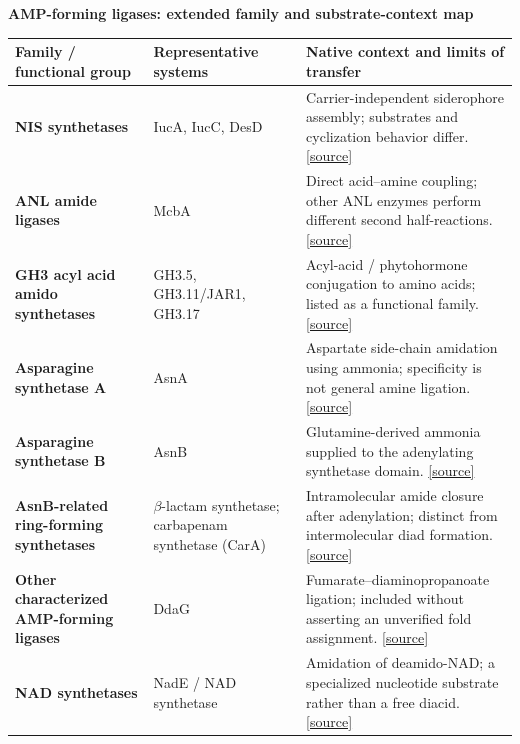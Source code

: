 \documentclass{article}
\begin{document}
{\fontsize{27}{32}\selectfont\bfseries\color{maroon} AMP-forming ligases: extended family and substrate-context map\par}
\par\vspace{16pt}
\fontsize{16}{20}\selectfont
\begin{tabularx}{\textwidth}{@{}>{\raggedright\arraybackslash}p{3.9in}>{\raggedright\arraybackslash}p{3.25in}Y@{}}
\toprule{}\textbf{Family / functional group} & \textbf{Representative systems} & \textbf{Native context and limits of transfer}\\\midrule
\textbf{NIS synthetases} & IucA, IucC, DesD & Carrier-independent siderophore assembly; substrates and cyclization behavior differ. \href{https://pmc.ncbi.nlm.nih.gov/articles/PMC7325057/}{[source]} \\[5pt]
\textbf{ANL amide ligases} & McbA & Direct acid--amine coupling; other ANL enzymes perform different second half-reactions. \href{https://doi.org/10.1002/ange.201804592}{[source]} \\[5pt]
\textbf{GH3 acyl acid amido synthetases} & GH3.5, GH3.11/JAR1, GH3.17 & Acyl-acid / phytohormone conjugation to amino acids; listed as a functional family. \href{https://pmc.ncbi.nlm.nih.gov/articles/PMC11253546/}{[source]} \\[5pt]
\textbf{Asparagine synthetase A} & AsnA & Aspartate side-chain amidation using ammonia; specificity is not general amine ligation. \href{https://iubmb.qmul.ac.uk/enzyme/EC6/3/1/1.html}{[source]} \\[5pt]
\textbf{Asparagine synthetase B} & AsnB & Glutamine-derived ammonia supplied to the adenylating synthetase domain. \href{https://pmc.ncbi.nlm.nih.gov/articles/PMC2610506/}{[source]} \\[5pt]
\textbf{AsnB-related ring-forming synthetases} & $\beta$-lactam synthetase; carbapenam synthetase (CarA) & Intramolecular amide closure after adenylation; distinct from intermolecular diad formation. \href{https://pmc.ncbi.nlm.nih.gov/articles/PMC2610506/}{[source]} \\[5pt]
\textbf{Other characterized AMP-forming ligases} & DdaG & Fumarate--diaminopropanoate ligation; included without asserting an unverified fold assignment. \href{https://doi.org/10.1021/bi9013165}{[source]} \\[5pt]
\textbf{NAD synthetases} & NadE / NAD synthetase & Amidation of deamido-NAD; a specialized nucleotide substrate rather than a free diacid. \href{https://iubmb.qmul.ac.uk/enzyme/EC6/3/1/5.html}{[source]} \\[5pt]

\end{tabularx}
\end{document}
